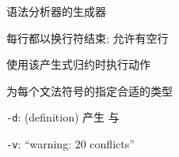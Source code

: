 
\begin{frame}{}

  \vspace{0.10cm}
  \begin{center}
     语法分析器的生成器
  \end{center}
\end{frame}

\begin{frame}{}
  \begin{center}
     每行都以换行符结束; 允许有空行


  \end{center}
\end{frame}

\begin{frame}{}
  \begin{center}
     使用该产生式归约时执行动作

  \end{center}
\end{frame}

\begin{frame}{}
  \begin{center}
     为每个文法符号的指定合适的类型

  \end{center}
\end{frame}

\begin{frame}{}
  \begin{center}

    \vspace{0.80cm}
    \texttt{-d}: (definition) 产生 
      与 

    \vspace{0.80cm}
    \texttt{-v}: ``warning: 20  conflicts''
  \end{center}
\end{frame}

